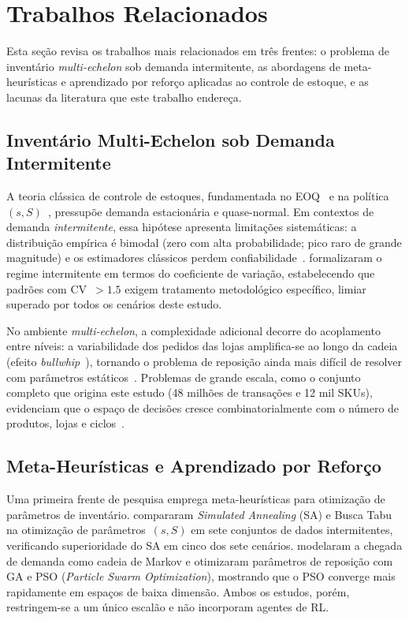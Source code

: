 \documentclass[a4paper,11pt]{article}
\begin{document}
\section{Trabalhos Relacionados}

Esta seção revisa os trabalhos mais relacionados em três frentes:
o problema de inventário \textit{multi-echelon} sob demanda
intermitente, as abordagens de meta-heurísticas e aprendizado por
reforço aplicadas ao controle de estoque, e as lacunas da literatura
que este trabalho endereça.

\subsection{Inventário Multi-Echelon sob Demanda Intermitente}

A teoria clássica de controle de estoques, fundamentada no
EOQ~\citep{harris:1913} e na política~$(s,S)$~\citep{hadley:1963},
pressupõe demanda estacionária e quase-normal. Em contextos de
demanda \emph{intermitente}, essa hipótese apresenta limitações
sistemáticas: a distribuição empírica é bimodal (zero com alta
probabilidade; pico raro de grande magnitude) e os estimadores
clássicos perdem confiabilidade~\citep{croston:1972}. \citet{syntetos:2001}
formalizaram o regime intermitente em termos do coeficiente de
variação, estabelecendo que padrões com CV~$>1.5$ exigem tratamento
metodológico específico, limiar superado por todos os cenários
deste estudo.

No ambiente \textit{multi-echelon}, a complexidade adicional decorre
do acoplamento entre níveis: a variabilidade dos pedidos das lojas
amplifica-se ao longo da cadeia (efeito
\textit{bullwhip}~\citep{lee:1997}), tornando o problema de
reposição ainda mais difícil de resolver com parâmetros
estáticos~\citep{axsater:2006,clark:1960}. Problemas de grande
escala, como o conjunto completo que origina este estudo (48 milhões
de transações e 12 mil SKUs), evidenciam que o espaço
de decisões cresce combinatorialmente com o número de produtos,
lojas e ciclos~\citep{shapiro:2001,boute:2022}.

\subsection{Meta-Heurísticas e Aprendizado por Reforço}

Uma primeira frente de pesquisa emprega meta-heurísticas para
otimização de parâmetros de inventário. \citet{yuna:2023}
compararam \textit{Simulated Annealing} (SA) e Busca Tabu na
otimização de parâmetros~$(s,S)$ em sete conjuntos de dados
intermitentes, verificando superioridade do SA em cinco dos sete
cenários. \citet{erkayman:2025} modelaram a chegada de demanda como
cadeia de Markov e otimizaram parâmetros de reposição com GA e PSO
(\textit{Particle Swarm Optimization}), mostrando que o PSO
converge mais rapidamente em espaços de baixa dimensão. Ambos os
estudos, porém, restringem-se a um único escalão e não incorporam
agentes de RL.
\end{document}
